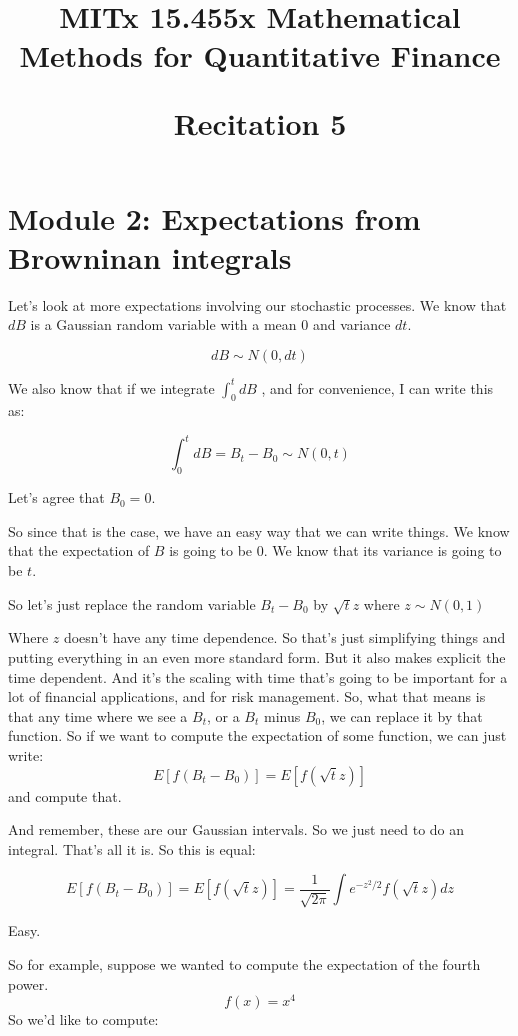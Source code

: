 \documentclass{article}
\begin{document}
	
	\title{MITx 15.455x Mathematical Methods for Quantitative Finance
	 \\
	\begin{large} 
		Recitation 5
	\end{large} }

	
	\maketitle
	
	\section*{Module 2: Expectations from Browninan integrals}
	
Let's look at more expectations involving
our stochastic processes.
We know that $dB$ is a Gaussian random variable
with a mean $0$ and variance $dt$.

$$ dB \sim N(0,dt) $$

We also know that if we integrate $\int_{0}^{t} dB$ , and for convenience, I can write this as:

$$  \int_{0}^{t} dB = B_t - B_0 \sim N(0,t ) $$


Let's agree that $B_0=0$. 

So since that is the case, we have an easy way that we can write things.
We know that the expectation of $B$ is going to be 0.
We know that its variance is going to be $t$.


So let's just replace the random variable $B_t-B_0$ by $\sqrt{t}z$ where $z \sim N(0,1)$


Where $z$ doesn't have any time dependence.  So that's just simplifying things and putting everything
in an even more standard form. But it also makes explicit the time dependent.
And it's the scaling with time that's going to be important for a lot of financial applications, and for risk management.
So, what that means is that any time
where we see a $B_t$, or a $B_t$ minus $B_0$,
we can replace it by that function.
So if we want to compute the expectation of some function, we can just write: $$E[f(B_t-B_0)] = E[f(\sqrt{t} z)]$$  and compute that.

And remember, these are our Gaussian intervals. So we just need to do an integral. That's all it is. So this is equal:

 $$E[f(B_t-B_0)] = E[f(\sqrt{t} z)] = \frac{1}{\sqrt{2\pi}} \int e^{-z^2/2}f(\sqrt{t}z) dz$$ 

Easy.

So for example, suppose we wanted to compute the expectation of the fourth power.
 $$ f(x) = x^4$$
So we'd like to compute:
\end{document}
